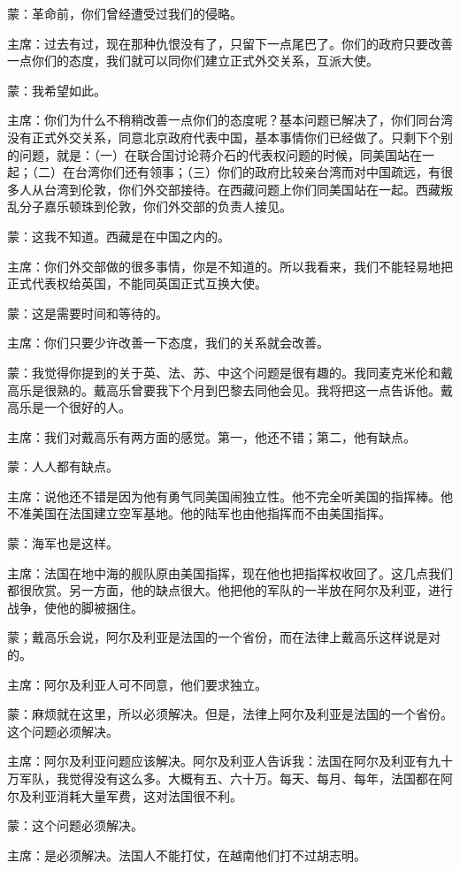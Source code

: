 蒙：革命前，你们曾经遭受过我们的侵略。

主席：过去有过，现在那种仇恨没有了，只留下一点尾巴了。你们的政府只要改善一点你们的态度，我们就可以同你们建立正式外交关系，互派大使。

蒙：我希望如此。

主席：你们为什么不稍稍改善一点你们的态度呢？基本问题已解决了，你们同台湾没有正式外交关系，同意北京政府代表中国，基本事情你们已经做了。只剩下个别的问题，就是：（一）在联合国讨论蒋介石的代表权问题的时候，同美国站在一起；（二）在台湾你们还有领事；（三）你们的政府比较亲台湾而对中国疏远，有很多人从台湾到伦敦，你们外交部接待。在西藏问题上你们同美国站在一起。西藏叛乱分子嘉乐顿珠到伦敦，你们外交部的负责人接见。

蒙：这我不知道。西藏是在中国之内的。

主席：你们外交部做的很多事情，你是不知道的。所以我看来，我们不能轻易地把正式代表权给英国，不能同英国正式互换大使。

蒙：这是需要时间和等待的。

主席：你们只要少许改善一下态度，我们的关系就会改善。

蒙：我觉得你提到的关于英、法、苏、中这个问题是很有趣的。我同麦克米伦和戴高乐是很熟的。戴高乐曾要我下个月到巴黎去同他会见。我将把这一点告诉他。戴高乐是一个很好的人。

主席：我们对戴高乐有两方面的感觉。第一，他还不错；第二，他有缺点。

蒙：人人都有缺点。

主席：说他还不错是因为他有勇气同美国闹独立性。他不完全听美国的指挥棒。他不准美国在法国建立空军基地。他的陆军也由他指挥而不由美国指挥。

蒙：海军也是这样。

主席：法国在地中海的舰队原由美国指挥，现在他也把指挥权收回了。这几点我们都很欣赏。另一方面，他的缺点很大。他把他的军队的一半放在阿尔及利亚，进行战争，使他的脚被捆住。

蒙；戴高乐会说，阿尔及利亚是法国的一个省份，而在法律上戴高乐这样说是对的。

主席：阿尔及利亚人可不同意，他们要求独立。

蒙：麻烦就在这里，所以必须解决。但是，法律上阿尔及利亚是法国的一个省份。这个问题必须解决。

主席：阿尔及利亚问题应该解决。阿尔及利亚人告诉我：法国在阿尔及利亚有九十万军队，我觉得没有这么多。大概有五、六十万。每天、每月、每年，法国都在阿尔及利亚消耗大量军费，这对法国很不利。

蒙：这个问题必须解决。

主席：是必须解决。法国人不能打仗，在越南他们打不过胡志明。

